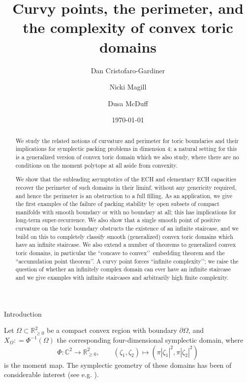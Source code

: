 \documentclass[11pt, reqno]{amsart}
\date{\today}
\title{Curvy points, the perimeter, and the complexity of 
convex toric domains}
\author{Dan Cristofaro-Gardiner}
\author{Nicki Magill}
\author{Dusa McDuff}
\makeatletter
\def\section{\@startsection{section}{1}%
  \z@{.7\linespacing\@plus\linespacing}{.5\linespacing}%
  {\normalfont\Large\bfseries}}
\theoremstyle{remark}
\numberwithin{equation}{subsection}
\numberwithin{figure}{section}
\theoremstyle{customremark}
\newcommand{\Om}{{\Omega}}
\newcommand{\p}{{\partial}}
\newcommand{\R}{\mathbb{R}}
\newcommand{\C}{\mathbb{C}}
\makeatother
\begin{document}
\begin{abstract}

We study the related notions of curvature and perimeter for toric boundaries and their implications for symplectic packing problems in dimension $4$; a natural setting for this is a generalized version of convex toric domain which we also study, where there are no conditions on the moment polytope at all aside from convexity.

We show that the subleading asymptotics of the ECH and elementary ECH capacities recover the perimeter of such domains in their liminf, without any genericity required, and hence the perimeter is an obstruction to a full filling.  As an application, we give the first examples of the failure of packing stability by open subsets of compact manifolds with smooth boundary or with no boundary at all; this has implications for long-term super-recurrence.   We also show that a single smooth point of positive curvature on the toric boundary obstructs the existence of an infinite staircase, and we build on this to completely classify smooth (generalized) convex toric domains which have an infinite staircase.  We also extend a number of theorems to generalized convex toric domains, in particular the  ``concave to convex\rq\rq\, embedding theorem and the ``accumulation point theorem\rq\rq.   A curvy point forces ``infinite complexity\rq\rq; we raise the question of whether an infinitely complex domain can ever have an infinite staircase and we give examples with infinite staircases and arbitrarily high finite complexity.
\end{abstract}







\maketitle


\tableofcontents

\section{Introduction}



Let $\Om\subset \R^2_{\ge 0}$ be a compact convex region with boundary $\p \Om$, and $X_\Om: = \Phi^{-1}(\Om)$  the corresponding four-dimensional symplectic domain,
where $$
\Phi:\C^2\to 
\R^2_{\ge 0},\qquad (\zeta_1, \zeta_2)\mapsto (\pi |\zeta_1|^2 , \pi |\zeta_2|^2)
$$ is the moment map.  The symplectic geometry of these domains has been of considerable interest (see e.g. \cite{CG, cghind, AADT, Hutchq, Ruel, Helem, Usher, BHM, Choi, CG2, AADT, JinL, ball}).
\end{document}
